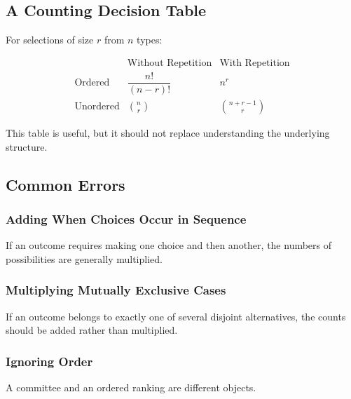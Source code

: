 \subsection{A Counting Decision Table}
\label{subsec:counting-decision-table}

For selections of size \(r\) from \(n\) types:

\[
\boxed{
\begin{array}{c|c|c}
& \text{Without Repetition} & \text{With Repetition}\\
\hline
\text{Ordered}
&
\dfrac{n!}{(n-r)!}
&
n^r
\\[3mm]
\text{Unordered}
&
\binom{n}{r}
&
\binom{n+r-1}{r}
\end{array}
}
\]

This table is useful, but it should not replace understanding the
underlying structure.

\subsection{Common Errors}
\label{subsec:basic-counting-errors}

\subsubsection{Adding When Choices Occur in Sequence}

If an outcome requires making one choice and then another, the numbers
of possibilities are generally multiplied.

\subsubsection{Multiplying Mutually Exclusive Cases}

If an outcome belongs to exactly one of several disjoint alternatives,
the counts should be added rather than multiplied.

\subsubsection{Ignoring Order}

A committee and an ordered ranking are different objects.

